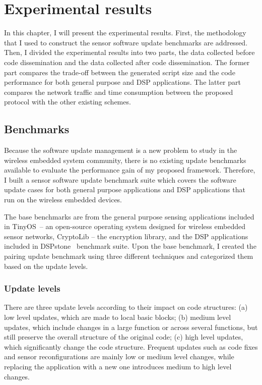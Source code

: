 \chapter{Experimental results}
In this chapter, I will present the experimental results.
First, the methodology that I used to construct the sensor software update benchmarks are addressed.
Then, I divided the experimental results into two parts,
the data collected before code dissemination and the data collected after code dissemination.
The former part compares the trade-off between the generated script size and the code performance for both general purpose and DSP applications.
The latter part compares the network traffic and time consumption between the proposed protocol with
the other existing schemes.

\section{Benchmarks}
Because the software update management is a new problem to study
in the wireless embedded system community, there is no existing
update benchmarks available to evaluate the performance gain
of my proposed framework.
Therefore, I built a sensor software update benchmark suite
which covers the software update cases for both general purpose
applications and DSP applications that run on the wireless
embedded devices.

The base benchmarks are from the general purpose
sensing applications included in TinyOS~\cite{tinyos}--
an open-source operating system designed for wireless embedded
sensor networks, CryptoLib -- the encryption library, and the DSP applications included in 
DSPstone~\cite{dspstone} benchmark suite. 
Upon the base benchmark, I created the pairing update benchmark
using three different techniques and categorized them based on the update levels.

\subsection{Update levels}
There are three update levels according to their
impact on code structures: 
(a) low level updates, which are made to local basic blocks; 
(b) medium level updates, which include changes in a large
function or across several functions, but still preserve the overall
structure of the original code; 
(c) high level updates, which significantly
change the code structure. Frequent updates such as code fixes and
sensor reconfigurations are mainly low or medium level changes, while
replacing the application with a new one introduces medium to high level
changes. 

